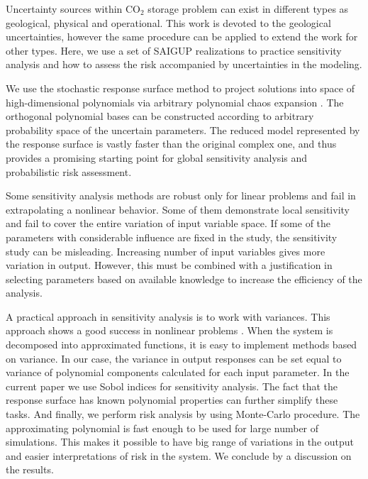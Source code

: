 Uncertainty sources within $\mbox{CO}_{2}$ storage problem can exist in different types as geological, physical and operational. This work is devoted to the geological uncertainties, however the same procedure can be applied to extend the work for other types. Here, we use a set of SAIGUP realizations to practice sensitivity analysis and how to assess the risk accompanied by uncertainties in the modeling. 

We use the stochastic response surface method to project solutions into space of high-dimensional polynomials via arbitrary polynomial chaos expansion \cite{oladyshkin2011concept}. The orthogonal polynomial bases can be constructed according to arbitrary probability space of the uncertain parameters. The reduced model represented by the response surface is vastly faster than the original complex one, and thus provides a promising starting point for global sensitivity analysis and probabilistic risk assessment.  

Some sensitivity analysis methods are robust only for linear problems and fail in extrapolating a nonlinear behavior. Some of them demonstrate local sensitivity and fail to cover the entire variation of input variable space. If some of the parameters with considerable influence are fixed in the study, the sensitivity study can be misleading. Increasing number of input variables gives more variation in output. However, this must be combined with a justification in selecting parameters based on available knowledge to increase the efficiency of the analysis. 

A practical approach in sensitivity analysis is to work with variances. This approach shows a good success in nonlinear problems \cite{reuter2008global}. When the system is decomposed into approximated functions, it is easy to implement methods based on variance. In our case, the variance in output responses can be set equal to variance of polynomial components calculated for each input parameter. In the current paper we use Sobol indices \cite{sobol2001global} for sensitivity analysis. The fact that the response surface has known polynomial properties \cite{OladNowakBarros_AWR2011} can further simplify these tasks. And finally, we perform risk analysis by using Monte-Carlo procedure. The approximating polynomial is fast enough to be used for large number of simulations. This makes it possible to have big range of variations in the output and easier interpretations of risk in the system. We conclude by a discussion on the results.



